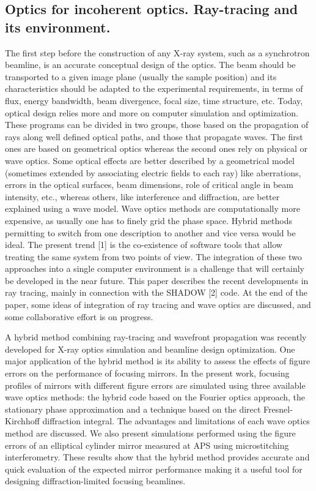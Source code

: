 \documentclass{aip-cp}
\begin{document}
\subsection{Optics for incoherent optics. Ray-tracing and its environment.}

The first step before the construction of any X-ray system, such as a synchrotron beamline, is an
accurate conceptual design of the optics. The beam should be transported to a given image plane
(usually the sample position) and its characteristics should be adapted to the experimental
requirements, in terms of flux, energy bandwidth, beam divergence, focal size, time structure, etc.
Today, optical design relies more and more on computer simulation and optimization. These programs
can be divided in two groups, those based on the propagation of rays along well defined optical paths,
and those that propagate waves. The first ones are based on geometrical optics whereas the second
ones rely on physical or wave optics. Some optical effects are better described by a geometrical model
(sometimes extended by associating electric fields to each ray) like aberrations, errors in the optical
surfaces, beam dimensions, role of critical angle in beam intensity, etc., whereas others, like
interference and diffraction, are better explained using a wave model. Wave optics methods are
computationally more expensive, as usually one has to finely grid the phase space. Hybrid methods
permitting to switch from one description to another and vice versa would be ideal. The present trend
[1] is the co-existence of software tools that allow treating the same system from two points of view.
The integration of these two approaches into a single computer environment is a challenge that will
certainly be developed in the near future. This paper describes the recent developments in ray tracing,
mainly in connection with the SHADOW [2] code. At the end of the paper, some ideas of integration
of ray tracing and wave optics are discussed, and some collaborative effort is on progress. 

A hybrid method combining ray-tracing and wavefront propagation was recently developed for X-ray optics simulation and beamline design optimization. One major application of the hybrid method is its ability to assess the effects of figure errors on the performance of focusing mirrors. In the present work, focusing profiles of mirrors with different figure errors are simulated using three available wave optics methods: the hybrid code based on the Fourier optics approach, the stationary phase approximation and a technique based on the direct Fresnel-Kirchhoff diffraction integral. The advantages and limitations of each wave optics method are discussed. We also present simulations performed using the figure errors of an elliptical cylinder mirror measured at APS using microstitching interferometry. These results show that the hybrid method provides accurate and quick evaluation of the expected mirror performance making it a useful tool for designing diffraction-limited focusing beamlines.
\end{document}
